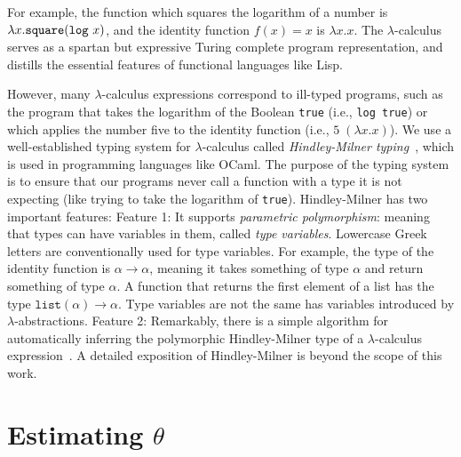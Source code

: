 \documentclass{article}
\begin{document}
For example, the function which squares the logarithm of a number is
$\lambda x.\text{\texttt{square}} (\text{\texttt{log} } x)$, and the identity function $f(x) = x$ is $\lambda x.x$. The
$\lambda$-calculus serves as a spartan but expressive Turing complete
program representation, and distills the essential features of functional languages like Lisp.

However, many $\lambda$-calculus expressions correspond to ill-typed programs, such as the program that takes the logarithm of the Boolean \texttt{true} (i.e., \texttt{log true}) or which applies the number five to the identity function
(i.e., $5 \; (\lambda x.x)$).
We use a well-established typing system for $\lambda$-calculus called \emph{Hindley-Milner typing}~\cite{pierce}, which is used in programming languages like OCaml.
The purpose of the typing system is to ensure that our programs never call a function with a type it is not expecting (like trying to take the logarithm of \texttt{true}).
Hindley-Milner has two important features:
Feature 1: It supports \emph{parametric polymorphism}: meaning that types can have variables in them, called \emph{type variables}. Lowercase Greek letters are conventionally used for  type variables.
For example, the type of the identity function is $\alpha\to\alpha$, meaning it takes something of type $\alpha$ and return something of type $\alpha$. A function that returns the first element of a list has the type $\texttt{list}(\alpha)\to\alpha$. Type variables are not the same has variables introduced by $\lambda$-abstractions.
Feature 2: Remarkably, there is a  simple algorithm for automatically inferring the polymorphic Hindley-Milner type of a $\lambda$-calculus expression~\cite{damas1982principal}.
A detailed exposition of Hindley-Milner is beyond the scope of this work.



\section{Estimating $\theta$}
\end{document}

